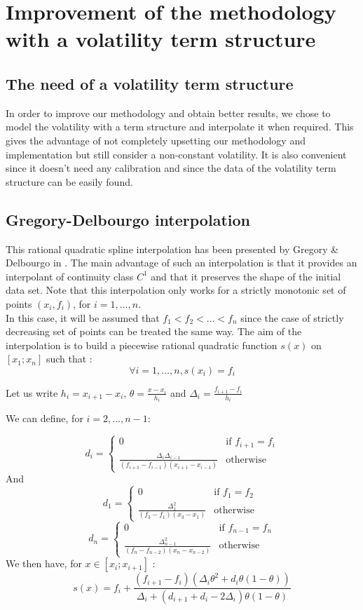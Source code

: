 \documentclass[a4paper,11pt,english]{book}
\begin{document}
\section{Improvement of the methodology with a volatility term structure}
\subsection{The need of a volatility term structure}
In order to improve our methodology and obtain better results, we chose to model the volatility with a term structure and interpolate it when required. This gives the advantage of not completely upsetting our methodology and implementation but still consider a non-constant volatility. It is also convenient since it doesn't need any calibration and since the data of the volatility term structure can be easily found.

\subsection{Gregory-Delbourgo interpolation}
This rational quadratic spline interpolation has been presented by Gregory \& Delbourgo in \cite{gregory1982piecewise}. The main advantage of such an interpolation is that it provides an interpolant of continuity class $C^1$ and that it preserves the shape of the initial data set. Note that this interpolation only works for a strictly monotonic set of points $(x_i,f_i)$, for $i=1,\ldots,n$. \\

In this case, it will be assumed that $f_1 < f_2 < \ldots< f_n$ since the case of strictly decreasing set of points can be treated the same way. The aim of the interpolation is to build a piecewise rational quadratic function $s(x)$ on $[x_1;x_n]$ such that :
$$\forall i=1,\ldots,n, s(x_i)=f_i$$

Let us write $h_i=x_{i+1}-x_i$, $\theta=\frac{x-x_i}{h_i}$ and $\Delta_i=\frac{f_{i+1}-f_i}{h_i}$

We can define, for $i=2,\ldots,n-1$: 

$$d_i = \begin{cases}
0 & \text{if } f_{i+1}=f_i \\
\frac{\Delta_i\Delta_{i-1}}{(f_{i+1}-f_{i-1})(x_{i+1}-x_{i-1})} & \text{otherwise }
\end{cases}$$
\vspace{0.2cm}
And 
\vspace{0.2cm}
$$d_1 = \begin{cases}
0 & \text{if } f_{1}=f_2 \\
\frac{\Delta_1^2}{(f_{3}-f_{1})(x_{3}-x_{1})} & \text{otherwise }
\end{cases}$$
\vspace{0.2cm}
$$d_n = \begin{cases}
0 & \text{if } f_{n-1}=f_n \\
\frac{\Delta_{n-1}^2}{(f_{n}-f_{n-2})(x_{n}-x_{n-2})} & \text{otherwise }
\end{cases}$$
\newpage
We then have, for $x\in [x_i;x_{i+1}]$ : $$s(x) = f_i + \frac{(f_{i+1}-f_{i})(\Delta_i\theta^2+d_i\theta(1-\theta))}{\Delta_i+(d_{i+1}+d_i-2\Delta_i)\theta(1-\theta)}$$
\end{document}
